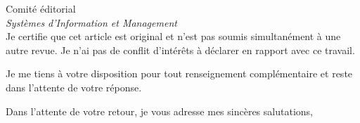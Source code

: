 \documentclass[12pt,a4paper]{letter}
\begin{document}
\begin{letter}{%
  Comité éditorial\\
  \textit{Systèmes d'Information et Management}\\
}
Je certifie que cet article est original et n'est pas soumis simultanément à une autre revue. Je n'ai pas de conflit d'intérêts à déclarer en rapport avec ce travail.

Je me tiens à votre disposition pour tout renseignement complémentaire et reste dans l'attente de votre réponse.

\closing{Dans l'attente de votre retour, je vous adresse mes sincères salutations,}

\end{letter}
\end{document}

